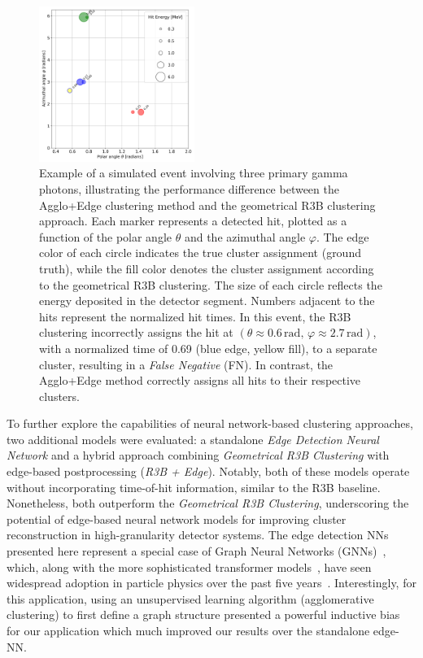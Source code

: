 \documentclass[final,5p,times,twocolumn]{elsarticle}
\begin{document}
\begin{figure}[!htb]
        \centering
        \includegraphics[width=0.45\textwidth]{example_event_9114.png}
	    \caption{Example of a simulated event involving three primary gamma photons, illustrating the performance difference between the Agglo+Edge clustering method and the geometrical R3B clustering approach. Each marker represents a detected hit, plotted as a function of the polar angle \(\theta\) and the azimuthal angle \(\varphi\). The edge color of each circle indicates the true cluster assignment (ground truth), while the fill color denotes the cluster assignment according to the geometrical R3B clustering. The size of each circle reflects the energy deposited in the detector segment. Numbers adjacent to the hits represent the normalized hit times. In this event, the R3B clustering incorrectly assigns the hit at \((\theta \approx 0.6\,\mathrm{rad},\, \varphi \approx 2.7\,\mathrm{rad})\), with a normalized time of 0.69 (blue edge, yellow fill), to a separate cluster, resulting in a \textit{False Negative} (FN). In contrast, the Agglo+Edge method correctly assigns all hits to their respective clusters.}
        \label{fig:comparison_r3b_agglo_edge}%
\end{figure}

To further explore the capabilities of neural network-based clustering approaches, two additional models were evaluated: a standalone \textit{Edge Detection Neural Network} and a hybrid approach combining \textit{Geometrical R3B Clustering} with edge-based postprocessing (\textit{R3B + Edge}). Notably, both of these models operate without incorporating time-of-hit information, similar to the R3B baseline. Nonetheless, both outperform the \textit{Geometrical R3B Clustering}, underscoring the potential of edge-based neural network models for improving cluster reconstruction in high-granularity detector systems.\newline
The edge detection NNs presented here represent a special case of Graph Neural Networks (GNNs)~\cite{battaglia2018relational}, which, along with the more sophisticated transformer models~\cite{vaswani2017attention,amatriain2023transformer}, have seen widespread adoption in particle physics over the past five years~\cite{dezoort2021charged,ju2021performance,van2024transformers}. Interestingly, for this application, using an unsupervised learning algorithm (agglomerative clustering) to first define a graph structure presented a powerful inductive bias for our application which much improved our results over the standalone edge-NN.
\end{document}

